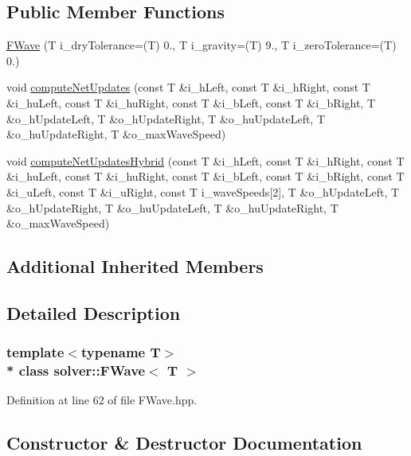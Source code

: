 \subsection*{Public Member Functions}
\begin{DoxyCompactItemize}
\item 
\hyperlink{classsolver_1_1FWave_a7cd616d6b271714e7897ab00c89cc346}{F\+Wave} (T i\+\_\+dry\+Tolerance=(T) 0., T i\+\_\+gravity=(T) 9., T i\+\_\+zero\+Tolerance=(T) 0.)
\item 
void \hyperlink{classsolver_1_1FWave_a28446b13c979263d5c06ac1e633840bf}{compute\+Net\+Updates} (const T \&i\+\_\+h\+Left, const T \&i\+\_\+h\+Right, const T \&i\+\_\+hu\+Left, const T \&i\+\_\+hu\+Right, const T \&i\+\_\+b\+Left, const T \&i\+\_\+b\+Right, T \&o\+\_\+h\+Update\+Left, T \&o\+\_\+h\+Update\+Right, T \&o\+\_\+hu\+Update\+Left, T \&o\+\_\+hu\+Update\+Right, T \&o\+\_\+max\+Wave\+Speed)
\item 
void \hyperlink{classsolver_1_1FWave_a84199b85cf0ea72f1d7419cabc0fe7c2}{compute\+Net\+Updates\+Hybrid} (const T \&i\+\_\+h\+Left, const T \&i\+\_\+h\+Right, const T \&i\+\_\+hu\+Left, const T \&i\+\_\+hu\+Right, const T \&i\+\_\+b\+Left, const T \&i\+\_\+b\+Right, const T \&i\+\_\+u\+Left, const T \&i\+\_\+u\+Right, const T i\+\_\+wave\+Speeds\mbox{[}2\mbox{]}, T \&o\+\_\+h\+Update\+Left, T \&o\+\_\+h\+Update\+Right, T \&o\+\_\+hu\+Update\+Left, T \&o\+\_\+hu\+Update\+Right, T \&o\+\_\+max\+Wave\+Speed)
\end{DoxyCompactItemize}
\subsection*{Additional Inherited Members}


\subsection{Detailed Description}
\subsubsection*{template$<$typename T$>$\\*
class solver\+::\+F\+Wave$<$ T $>$}



Definition at line 62 of file F\+Wave.\+hpp.



\subsection{Constructor \& Destructor Documentation}
